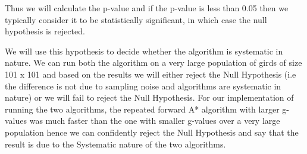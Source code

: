 \documentclass{article}
\begin{document}
Thus we will calculate the p-value and if the p-value is less than 0.05 then we typically consider it to be statistically significant, in which case the null hypothesis is rejected.

We will use this hypothesis to decide whether the algorithm is systematic in nature. We can run both the algorithm on a very large population of girds of size 101 x 101 and based on the results we will either reject the Null Hypothesis (i.e the difference is not due to sampling noise and algorithms are systematic in nature) or we will fail to reject the Null Hypothesis. For our implementation of running the two algorithms, the repeated forward A* algorithm with larger g-values was much faster than the one with smaller g-values over a very large population hence we can confidently reject the Null Hypothesis and say that the result is due to the Systematic nature of the two algorithms.\cite{3}



\end{document}
